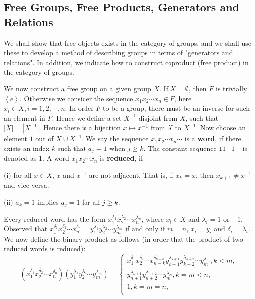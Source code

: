 \subsection{Free Groups, Free Products, Generators and Relations}
We shall show that free objects exists in the category of groups, and we shall use these to develop a method of describing groups in terms of "generators and relations". In addition, we indicate how to construct coproduct (free product) in the category of groups.\par
We now construct a free group on a given group $X$. If $X=\emptyset$, then $F$ is trivially $\left<e\right>$. Otherwise we consider the sequence $x_1x_2\cdots x_n\in F$, here $x_i\in X,i=1,2,\cdots,n$. In order $F$ to be a group, there must be an inverse for such an element in $F$. Hence we define a set $X^{-1}$ disjoint from $X$, such that $|X|=|X^{-1}|$. Hence there is a bijection $x\mapsto x^{-1}$ from $X$ to $X^{-1}$. Now choose an element $1$ out of $X\cup X^{-1}$. We say the sequence $x_1x_2\cdots x_n\cdots$ is a \textbf{word}, if there exists an index $k$ such that $a_j=1$ when $j\ge k$. The constant sequence $11\cdots1\cdots$ is denoted as $1$. A word $x_1x_2\cdots x_n$ is \textbf{reduced}, if \par
(i) for all $x\in X$, $x$ and $x^{-1}$ are not adjacent. That is, if $x_k=x$, then $x_{k+1}\ne x^{-1}$ and vice versa.\par
(ii) $a_k=1$ implies $a_j=1$ for all $j\ge k$.\par
Every reduced word has the form $x_1^{\lambda_1}x_2^{\lambda_2}\cdots x_n^{\lambda_n}$, where $x_i\in X$ and $\lambda_i=1$ or $-1$. Observed that $x_{1}^{\delta _1}x_{2}^{\delta _2}\cdots x_{n}^{\delta _n}=y_{1}^{\lambda _1}y_{2}^{\lambda _2}\cdots y_{m}^{\lambda _m}$ if and only if $m=n$, $x_i=y_i$ and $\delta_i=\lambda_i$. We now define the binary product as follows (in order that the product of two reduced words is reduced):
$$
\left( x_{1}^{\delta _1}x_{2}^{\delta _2}\cdots x_{n}^{\delta _n} \right) \left( y_{1}^{\lambda _1}y_{2}^{\lambda _2}\cdots y_{m}^{\lambda _m} \right) =\begin{cases}
	x_{1}^{\delta _1}x_{2}^{\delta _2}\cdots x_{n-k}^{\delta _{n-k}}y_{k+1}^{\lambda _{k+1}}y_{k+2}^{\lambda _{k+2}}\cdots y_{m}^{\lambda _m},k<m,\\
	y_{n+1}^{\lambda _{n+1}}y_{n+2}^{\lambda _{n+2}}\cdots y_{m}^{\lambda _m},k=m<n,\\
	1,k=m=n,\\
\end{cases}
$$
